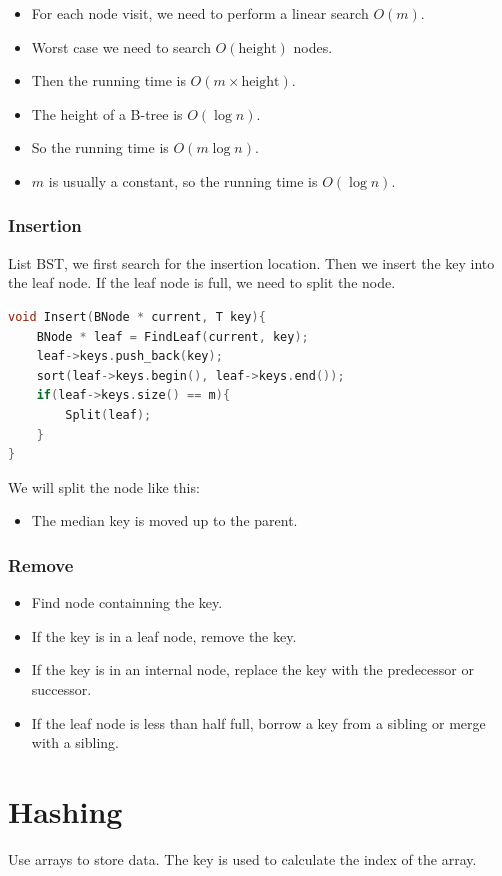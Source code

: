 \documentclass[letterpaper,12pt]{article}
\begin{document}
\begin{itemize}
    \item For each node visit, we need to perform a linear search $O(m)$.
    \item Worst case we need to search $O(\text{height})$ nodes.
    \item Then the running time is $O(m\times \text{height})$.
    \item The height of a B-tree is $O(\log n)$.
    \item So the running time is $O(m\log n)$.
    \item $m$ is usually a constant, so the running time is $O(\log n)$.
\end{itemize}
\subsubsection{Insertion}
List BST, we first search for the insertion location. Then we insert the key into the leaf node. If the leaf node is full, we need to split the node.
\begin{lstlisting}[language=C++]
void Insert(BNode * current, T key){
    BNode * leaf = FindLeaf(current, key);
    leaf->keys.push_back(key);
    sort(leaf->keys.begin(), leaf->keys.end());
    if(leaf->keys.size() == m){
        Split(leaf);
    }
}
\end{lstlisting}
We will split the node like this:\begin{itemize}
    \item The median key is moved up to the parent.
\end{itemize}
\subsubsection{Remove}
\begin{itemize}
    \item Find node containning the key.
    \item If the key is in a leaf node, remove the key.
    \item If the key is in an internal node, replace the key with the predecessor or successor.
    \item If the leaf node is less than half full, borrow a key from a sibling or merge with a sibling.
\end{itemize}
\section{Hashing}
Use arrays to store data. The key is used to calculate the index of the array.
\end{document}
